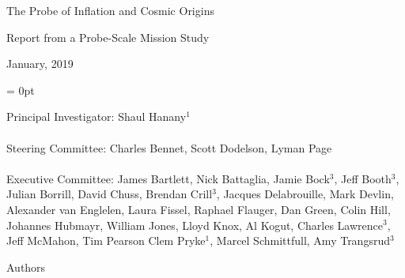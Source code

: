 \documentclass[PICOReport.tex]{subfiles}
\begin{document}

\LARGE{ \centerline{The Probe of Inflation and Cosmic Origins}}
\vspace{0.1in}
\Large{ \centerline{Report from a Probe-Scale Mission Study}}
\Large{ \centerline{January, 2019 }}

\parindent = 0pt
\normalsize{Principal Investigator: Shaul Hanany$^1$ \\
\vspace{-7pt} \\
\normalsize{Steering Committee: Charles Bennet, Scott Dodelson, Lyman Page } \\
\vspace{-7pt} \\
\normalsize{Executive Committee: 
James Bartlett,
Nick Battaglia,
Jamie Bock$^3$, 
Jeff Booth$^3$,
Julian Borrill, 
David Chuss,
Brendan Crill$^3$, 
Jacques Delabrouille,
Mark Devlin, 
Alexander van Englelen,
Laura Fissel,
Raphael Flauger, 
Dan Green,
Colin Hill,
Johannes Hubmayr,
William Jones, 
Lloyd Knox, 
Al Kogut, 
Charles Lawrence$^3$, 
Jeff McMahon, 
Tim Pearson
Clem Pryke$^1$, 
Marcel Schmittfull,
Amy Trangsrud$^3$ 
}
\\


\label{authorlist}

\Large  {\centerline {Authors}}

\footnotesize {

}}
\end{document}
